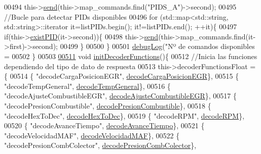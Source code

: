 \begin{DoxyCode}
{{{{{{{{{{{{{00494         this->\hyperlink{classObd_a453591bc9a280e8d44d82025ce8590e9}{send}(this->map\_commands.find(\textcolor{stringliteral}{"PIDS\_A"})->second);
00495         \textcolor{comment}{//Bucle para detectar PIDs disponibles}
00496         \textcolor{keywordflow}{for} (std::map<std::string, std::string>::iterator it=listPIDs.begin(); it!=listPIDs.end(); ++it)\{
00497             \textcolor{keywordflow}{if}(this->\hyperlink{classObd_aeff55ecb0a0a4278a22f20db3d2e17e3}{existPID}(it->second))\{
00498                 this->\hyperlink{classObd_a453591bc9a280e8d44d82025ce8590e9}{send}(this->map\_commands.find(it->first)->second); 
00499             \}
00500         \}
00501         \hyperlink{debug_8hpp_a55f41cf7b0585224496de3d7adbc101c}{debugLog}(\textcolor{stringliteral}{"Nº de comandos disponibles = %
00502     \}
00503 
\hyperlink{classObd_a560631b2e3af0a72c063f915a11e0466}{00511}     \textcolor{keywordtype}{void} \hyperlink{classObd_a560631b2e3af0a72c063f915a11e0466}{initDecoderFunctions}()\{
00512     \textcolor{comment}{//Inicia las funciones dependiendo del tipo de dato de respuesta    }
00513     this->decoderFunctionsFloat = \{
00514             \{ \textcolor{stringliteral}{"decodeCargaPosicionEGR"}, \hyperlink{decoders_8cpp_adbe68794075963c37e654d53b8a46f68}{decodeCargaPosicionEGR}\},
00515             \{ \textcolor{stringliteral}{"decodeTempGeneral"}, \hyperlink{decoders_8cpp_af581438645d7ff67766fa2e5eba5eaf9}{decodeTempGeneral}\},
00516             \{ \textcolor{stringliteral}{"decodeAjusteCombustibleEGR"}, \hyperlink{decoders_8cpp_aeee9e6d8511a934b3a3644b19de3f2b7}{decodeAjusteCombustibleEGR}\},
00517             \{ \textcolor{stringliteral}{"decodePresionCombustible"}, \hyperlink{decoders_8cpp_ab1c03e72734d4127a1c48f3b5a44a2e2}{decodePresionCombustible}\},
00518             \{ \textcolor{stringliteral}{"decodeHexToDec"}, \hyperlink{decoders_8cpp_aa7c5243702d5462e4b638450e750624e}{decodeHexToDec}\},
00519             \{ \textcolor{stringliteral}{"decodeRPM"}, \hyperlink{decoders_8cpp_a889868c7b1e554aee496e6aed7101cc4}{decodeRPM}\},
00520             \{ \textcolor{stringliteral}{"decodeAvanceTiempo"}, \hyperlink{decoders_8cpp_a7a2fee87eace8ad6c86c628f5f91b3b5}{decodeAvanceTiempo}\},
00521             \{ \textcolor{stringliteral}{"decodeVelocidadMAF"}, \hyperlink{decoders_8cpp_adceefeb78a70b295b378f4c472630aa1}{decodeVelocidadMAF}\},
00522             \{ \textcolor{stringliteral}{"decodePresionCombColector"}, \hyperlink{decoders_8cpp_a3e32aaf8ced989570e141f01210564f3}{decodePresionCombColector}\},
}}}}}}}}}}}}}}
\end{DoxyCode}

